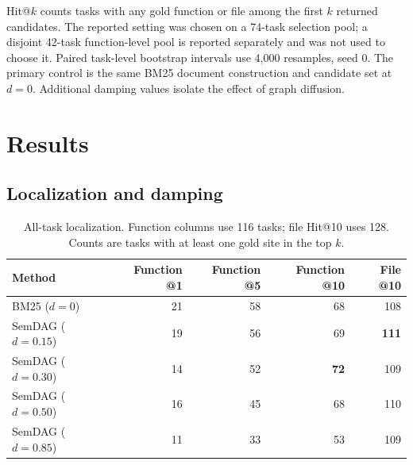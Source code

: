 \documentclass[11pt]{article}
\begin{document}
Hit@$k$ counts tasks with any gold function or file among the first $k$ returned candidates. The reported setting was chosen on a 74-task selection pool; a disjoint 42-task function-level pool is reported separately and was not used to choose it. Paired task-level bootstrap intervals use 4{,}000 resamples, seed 0. The primary control is the same BM25 document construction and candidate set at $d=0$. Additional damping values isolate the effect of graph diffusion.

\section{Results}
\subsection{Localization and damping}
\begin{table}[t]
\centering
\caption{All-task localization. Function columns use 116 tasks; file Hit@10 uses 128. Counts are tasks with at least one gold site in the top $k$.}
\label{tab:main}
\begin{tabular}{lrrrr}
\toprule
Method & Function @1 & Function @5 & Function @10 & File @10 \\
\midrule
BM25 ($d=0$) & 21 & 58 & 68 & 108 \\
SemDAG ($d=0.15$) & 19 & 56 & 69 & \textbf{111} \\
SemDAG ($d=0.30$) & 14 & 52 & \textbf{72} & 109 \\
SemDAG ($d=0.50$) & 16 & 45 & 68 & 110 \\
SemDAG ($d=0.85$) & 11 & 33 & 53 & 109 \\
\bottomrule
\end{tabular}
\end{table}
\end{document}
